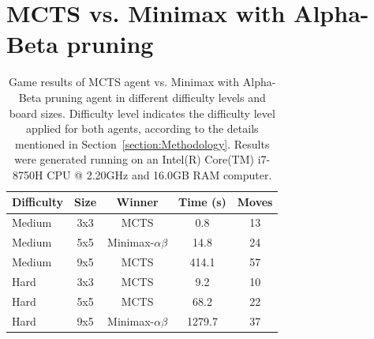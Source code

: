 \documentclass[journal]{IEEEtran}
\begin{document}
\newpage
\section{MCTS vs. Minimax with Alpha-Beta pruning}
\label{Appendix:resultsABvsMCTS}
\begin{table}[h!]
    \caption{Game results of MCTS agent vs. Minimax with Alpha-Beta pruning agent in different difficulty levels and board sizes. Difficulty level indicates the difficulty level applied for both agents, according to the details mentioned in Section~\ref{section:Methodology}. Results were generated running on an Intel(R) Core(TM) i7-8750H CPU @ 2.20GHz and 16.0GB RAM computer.}
    \centering
    \label{tab:ABvsMCTS}
        \begin{tabular}{l c c c c}
        \hline
        Difficulty & Size & Winner & Time (s) & Moves \\
        \hline
        Medium & 3x3 & MCTS                  &  0.8 & 13 \\
        Medium & 5x5 & Minimax-$\alpha\beta$ & 14.8 & 24 \\
        Medium & 9x5 & MCTS                  & 414.1 & 57 \\ 
        \addlinespace
        Hard & 3x3 & MCTS                   & 9.2 & 10 \\
        Hard & 5x5 & MCTS                   & 68.2 & 22 \\
        Hard & 9x5 & Minimax-$\alpha\beta$  & 1279.7 & 37 \\
        \hline
        \end{tabular}
\end{table}

\ifCLASSOPTIONcaptionsoff
  \newpage
\fi

\small

\normalsize
\end{document}
